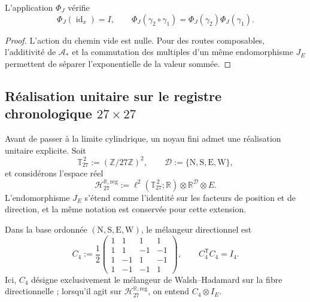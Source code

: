 \begin{proposition}
\label{x_reciprocidad:prop:fase-interna-functor-rev2}
L’application \(\Phi_J\) vérifie
\[
 \Phi_J(\operatorname{id}_x)=I,
 \qquad
 \Phi_J(\gamma_2\circ\gamma_1)
 =\Phi_J(\gamma_2)\Phi_J(\gamma_1).
\]
\end{proposition}

\begin{proof}
L’action du chemin vide est nulle. Pour des routes composables, l’additivité de
\(\mathcal A_*\) et la commutation des multiples d’un même endomorphisme
\(J_E\) permettent de séparer l’exponentielle de la valeur sommée.
\end{proof}

\subsection{Réalisation unitaire sur le registre chronologique
\texorpdfstring{\(27\times27\)}{27 x 27}}
\label{x_reciprocidad:sec:realizacion-unitaria-registro-27-rev3}

Avant de passer à la limite cylindrique, un noyau fini admet une réalisation
unitaire explicite. Soit
\[
 \mathbb T_{27}^{\,2}:=(\mathbb Z/27\mathbb Z)^2,
 \qquad
 \mathcal D:=\{\mathrm N,\mathrm S,\mathrm E,\mathrm W\},
\]
et considérons l’espace réel
\[
 \mathcal H_{27}^{\mathbb R,\mathrm{reg}}
 :=\ell^2(\mathbb T_{27}^{\,2};\mathbb R)
   \otimes\mathbb R^{\mathcal D}\otimes E.
\]
L'endomorphisme \(J_E\) s'étend comme l'identité sur les facteurs de position et de direction, et la même notation est conservée pour cette extension.

Dans la base ordonnée
\((\mathrm N,\mathrm S,\mathrm E,\mathrm W)\), le mélangeur directionnel est
\begin{equation}
 C_4:=\frac12
 \begin{pmatrix}
  1&1&1&1\\
  1&1&-1&-1\\
  1&-1&1&-1\\
  1&-1&-1&1
 \end{pmatrix},
 \qquad C_4^{\mathsf T}C_4=I_4.
 \label{x_reciprocidad:eq:mezclador-walsh-registro-27-rev3}
\end{equation}
Ici, \(C_4\) désigne exclusivement le mélangeur de Walsh--Hadamard sur la
fibre directionnelle ; lorsqu’il agit sur
\(\mathcal H_{27}^{\mathbb R,\mathrm{reg}}\), on entend
\(C_4\otimes I_E\).

